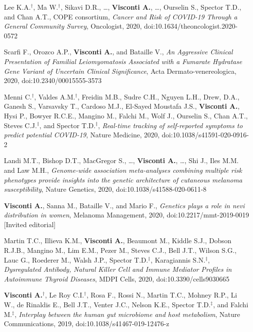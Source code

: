 {\begin{itemize}
		 Lee K.A.$^{\textbf{$\dag $}}$, Ma W.$^{\textbf{$\dag $}}$, Sikavi D.R., \dots, \textbf{Visconti A.}, \dots, Ourselin S., Spector T.D., and Chan A.T., COPE consortium, \emph{Cancer and Risk of COVID-19 Through a General Community Survey}, Oncologist, 2020, doi:10.1634/theoncologist.2020-0572	
		
		 Scarfi F., Orozco A.P., \textbf{Visconti A.}, and Bataille V., \emph{An Aggressive Clinical Presentation of Familial Leiomyomatosis Associated with a Fumarate Hydratase Gene Variant of Uncertain Clinical Significance}, Acta Dermato-venereologica, 2020, doi:10.2340/00015555-3573
		
		 Menni C.$^{\textbf{$\dag $}}$, Valdes A.M.$^{\textbf{$\dag $}}$, Freidin M.B., Sudre C.H., Nguyen L.H., Drew, D.A., Ganesh S., Varsavsky T., Cardoso M.J., El-Sayed Moustafa J.S., \textbf{Visconti A.}, Hysi P., Bowyer R.C.E., Mangino M., Falchi M., Wolf J., Ourselin S., Chan A.T., Steves C.J.$^{\textbf{$\ddag $}}$, and Spector T.D.$^{\textbf{$\ddag $}}$, \emph{Real-time tracking of self-reported symptoms to predict potential COVID-19}, Nature Medicine, 2020, doi:10.1038/s41591-020-0916-2

		 Landi M.T., Bishop D.T., MacGregor S., \dots, \textbf{Visconti A.}, \dots, Shi J., Iles M.M. and Law M.H., \emph{Genome-wide association meta-analyses combining multiple risk phenotypes provide insights into the genetic architecture of cutaneous melanoma susceptibility}, Nature Genetics, 2020, doi:10.1038/s41588-020-0611-8

		 \textbf{Visconti A.}, Sanna M., Bataille V., and Mario F., \emph{Genetics plays a role in nevi distribution in women}, Melanoma Management, 2020, doi:10.2217/mmt-2019-0019 [Invited editorial]

		 Martin T.C., Illieva K.M., \textbf{Visconti A.}, Beaumont M., Kiddle S.J., Dobson R.J.B., Mangino M., Lim E.M., Pezer M., Steves C.J., Bell J.T., Wilson S.G., Lauc G., Roederer M., Walsh J.P., Spector T.D.$^{\textbf{$\ddag $}}$, Karagiannis S.N.$^{\textbf{$\ddag $}}$, \emph{Dysregulated Antibody, Natural Killer Cell and Immune Mediator Profiles in Autoimmune Thyroid Diseases}, MDPI Cells, 2020, doi:10.3390/cells9030665
		
		 \textbf{Visconti A.}$^{\textbf{$\dag $}}$, Le Roy C.I.$^{\textbf{$\dag $}}$, Rosa F., Rossi N., Martin T.C., Mohney R.P., Li W., de Rinaldis E., Bell J.T., Venter J.C., Nelson K.E., Spector T.D.$^{\textbf{$\ddag $}}$, and Falchi M.$^{\textbf{$\ddag $}}$, \emph{Interplay between the human gut microbiome and host metabolism}, Nature Communications, 2019, doi:10.1038/s41467-019-12476-z


\end{itemize}}
